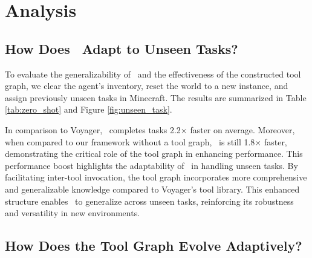 \section{Analysis}
\label{sec:aly} 
\subsection{How Does \ours\ Adapt to Unseen Tasks?}
% 
To evaluate the generalizability of \ours\ and the effectiveness of the constructed tool graph, we clear the agent's inventory, reset the world to a new instance, and assign previously unseen tasks in Minecraft. The results are summarized in Table \ref{tab:zero_shot} and Figure \ref{fig:unseen_task}.



In comparison to Voyager, \ours\ completes tasks 2.2× faster on average. Moreover, when compared to our framework without a tool graph, \ours\ is still 1.8× faster, demonstrating the critical role of the tool graph in enhancing performance. This performance boost highlights the adaptability of \ours\ in handling unseen tasks. By facilitating inter-tool invocation, the tool graph incorporates more comprehensive and generalizable knowledge compared to Voyager’s tool library. This enhanced structure enables \ours\ to generalize across unseen tasks, reinforcing its robustness and versatility in new environments.


\subsection{How Does the Tool Graph Evolve Adaptively?}


